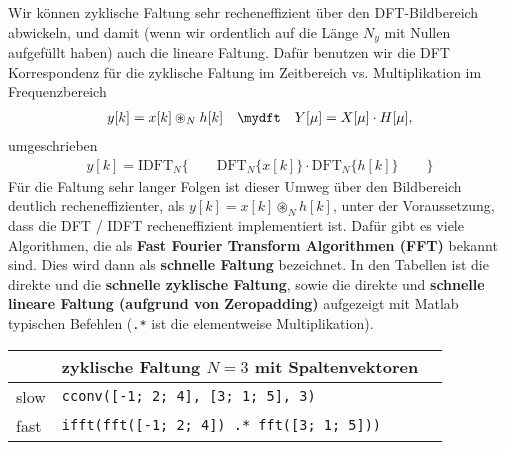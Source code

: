 \begin{ExCalc}
Wir können zyklische Faltung sehr recheneffizient über den DFT-Bildbereich
abwickeln, und damit (wenn wir ordentlich auf die Länge $N_y$ mit Nullen aufgefüllt haben)
auch die lineare Faltung.
%
Dafür benutzen wir die DFT Korrespondenz für die zyklische Faltung im
Zeitbereich vs. Multiplikation im Frequenzbereich
\begin{align}
y[k] = x[k] \circledast_N h[k] \quad\mydft\quad Y[\mu] = X[\mu] \cdot H[\mu],
\end{align}
umgeschrieben
\begin{align}
y[k] = \mathrm{IDFT}_N\{\qquad\mathrm{DFT}_N\{x[k]\} \cdot \mathrm{DFT}_N\{h[k]\}\qquad\}
\end{align}
Für die Faltung sehr langer Folgen ist dieser Umweg über den Bildbereich deutlich
recheneffizienter, als $y[k] = x[k] \circledast_N h[k]$, unter der Voraussetzung,
dass die DFT / IDFT recheneffizient implementiert ist. Dafür gibt es viele Algorithmen,
die als \textbf{Fast Fourier Transform Algorithmen (FFT)} bekannt sind.
%
Dies wird dann als \textbf{schnelle Faltung} bezeichnet. In den Tabellen
ist die direkte und die \textbf{schnelle zyklische Faltung}, sowie
die direkte und \textbf{schnelle
lineare Faltung (aufgrund von Zeropadding)} aufgezeigt mit Matlab
typischen Befehlen (\texttt{.*} ist die elementweise Multiplikation).
%
\end{ExCalc}


\begin{table}[h]
\centering
\begin{tabular}{| l | l | l |}
\hline
& zyklische Faltung $N=3$ mit Spaltenvektoren\\\hline
slow  & \texttt{cconv([-1; 2; 4], [3; 1; 5], 3)} \\\hline
fast  & \texttt{ifft(fft([-1; 2; 4]) .* fft([3; 1; 5]))}\\\hline
\end{tabular}
\end{table}



